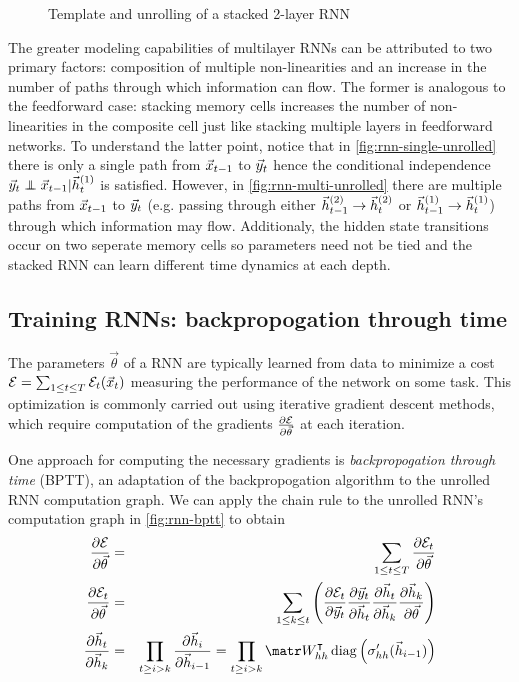 \documentclass[dissertation.tex]{subfiles}
\begin{document}
\begin{figure}[htpb]
    \centering
    \resizebox{4.5in}{!}{}
    \caption{Template and unrolling of a stacked 2-layer RNN}
    \label{fig:rnn-multi-unrolled}
\end{figure}

The greater modeling capabilities of multilayer RNNs can be attributed to two
primary factors: composition of multiple non-linearities and an increase in the
number of paths through which information can flow. The former is analogous to
the feedforward case: stacking memory cells increases the number of
non-linearities in the composite cell just like stacking multiple layers in
feedforward networks. To understand the latter point, notice that in
\autoref{fig:rnn-single-unrolled} there is only a single path from
$\vec{x}_{t-1}$ to $\vec{y}_{t}$ hence the conditional independence
$\y_{t} \independent \x_{t-1} | \h^{(1)}_t$ is satisfied.
However, in \autoref{fig:rnn-multi-unrolled} there are multiple paths from
$\vec{x}_{t-1}$ to $\vec{y}_{t}$ (e.g. passing through either
$\vec{h}^{(2)}_{t-1} \to \vec{h}^{(2)}_t$ or $\vec{h}^{(1)}_{t-1} \to
\vec{h}^{(1)}_t$) through which information may flow. Additionaly, the
hidden state transitions occur on two seperate memory cells so parameters
need not be tied and the stacked RNN can learn different time dynamics
at each depth.

\subsection{Training RNNs: backpropogation through time}

The parameters $\vec{\theta}$ of a RNN are typically learned from data to
minimize a cost $\mathcal{E} = \sum_{1 \leq t \leq T} \mathcal{E}_t(\vec{x}_t)$
measuring the performance of the network on some task. This optimization is
commonly carried out using iterative gradient descent methods, which require
computation of the gradients $\frac{\partial \mathcal{E}}{\partial \vec{\theta}}$ at each
iteration.

One approach for computing the necessary gradients is \emph{backpropogation
through time} (BPTT)\cite{goller1996learning}, an adaptation of the backpropogation
algorithm\cite{linnainmaa1970representation} \cite{rumelhart1988learning} to the unrolled RNN computation
graph. We can apply the chain rule to the unrolled RNN's computation graph in
\autoref{fig:rnn-bptt} to obtain
\begin{eqnarray}
    \frac{\pd \mathcal{E}}{\pd \vec{\theta}} &=& \sum_{1 \leq t \leq T} \frac{\pd \mathcal{E}_t}{\pd \vec{\theta}} \\
    \frac{\pd \mathcal{E}_t}{\pd \vec{\theta}} &=& \sum_{1 \leq k \leq t} \left(
        \frac{\pd \mathcal{E}_t}{\pd \y_t}
        \frac{\pd \y_t}{\pd \h_t}
        \frac{\pd \h_t}{\pd \h_k}
        \frac{\pd \h_k}{\pd \vec{\theta}}
    \right) \label{eq:error-t}\\
    \frac{\pd \h_t}{\pd \h_k} &=&
    \prod_{t \geq i > k} \frac{\pd \h_i}{\pd \h_{i-1}}
    = \prod_{t \geq i > k} \W_{hh}^\tp \diag \left( \sigma_{hh}'( \h_{i-1} ) \right)
    \label{eq:error-transfer}
\end{eqnarray}
\end{document}
